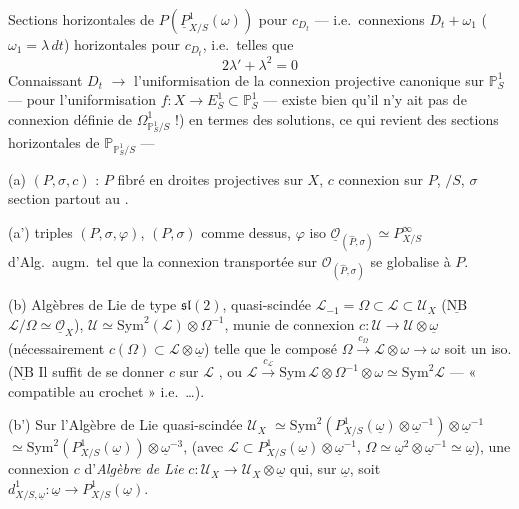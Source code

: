 \documentclass[11pt,a4paper]{article}
\begin{document}
Sections horizontales de $P(\underline{P}^1_{X/S}(\omega))$ pour $c_{D_t}$ — i.e.\ connexions $D_t+\omega_1$ ($\omega_1=\lambda\,dt$) horizontales pour $c_{D_t}$, i.e.\ telles que
\[
2\lambda'+\lambda^2=0
\]
Connaissant $D_t$ $\to$ l'uniformisation de la connexion projective canonique sur $\mathbb{P}^1_S$ — \ill{} pour l'uniformisation \emph{} $f:X\to E^1_S\subset\mathbb{P}^1_S$ — \ill{} existe bien qu'il n'y ait pas de connexion  définie de $\Omega^1_{\mathbb{P}^1_S/S}$ !) en termes des solutions, ce qui revient  des sections horizontales de $\mathbb{P}_{\mathbb{P}^1_S/S}$ —


(a) $(P,\sigma,c)$ : $P$ fibré en droites projectives sur $X$, $c$ connexion sur $P$,  $/S$, $\sigma$ section partout  au  \ill{}.

(a') triples $(P,\sigma,\varphi)$, $(P,\sigma)$ comme dessus, $\varphi$ iso \struck{\ill{}} $\underline{\mathcal{O}}_{(\widehat{P},\sigma)}\simeq P^\infty_{X/S}$ d'Alg.\ augm.\ tel que la connexion transportée sur $\mathcal{O}_{(\widehat{P},\sigma)}$  se globalise à $P$.

(b) Algèbres de Lie de type $\mathfrak{sl}(2)$, quasi-scindée $\mathcal{L}_{-1}=\Omega\subset\mathcal{L}\subset\mathcal{U}_X$ ($\underline{\text{NB}}$ $\mathcal{L}/\Omega\simeq\underline{\mathcal{O}}_X$), $\mathcal{U}\simeq\mathrm{Sym}^2(\mathcal{L})\otimes\Omega^{-1}$, munie de connexion $c:\mathcal{U}\to\mathcal{U}\otimes\underline{\omega}$ (nécessairement $c(\Omega)\subset\mathcal{L}\otimes\underline{\omega}$) telle que le composé $\Omega\xrightarrow{c_\Omega}\mathcal{L}\otimes\omega\to\omega$ soit un iso. ($\underline{\text{NB}}$ Il suffit de se donner $c$ sur $\mathcal{L}$ \struck{\ill{}}, ou $\mathcal{L}\xrightarrow{c_{\mathcal{L}}}\mathrm{Sym}\,\mathcal{L}\otimes\Omega^{-1}\otimes\omega\simeq\mathrm{Sym}^2\mathcal{L}$ — « compatible au crochet » i.e.\ …).

(b') Sur l'Algèbre de Lie quasi-scindée $\mathcal{U}_X$ $\simeq\mathrm{Sym}^2(P^1_{X/S}(\underline{\omega})\otimes\underline{\omega}^{-1})\otimes\underline{\omega}^{-1}$ $\simeq\mathrm{Sym}^2(P^1_{X/S}(\underline{\omega}))\otimes\underline{\omega}^{-3}$,  (avec $\mathcal{L}\subset P^1_{X/S}(\underline{\omega})\otimes\underline{\omega}^{-1}$, $\Omega\simeq\underline{\omega}^2\otimes\underline{\omega}^{-1}\simeq\underline{\omega}$), une connexion $c$ d'\emph{Algèbre de Lie} \struck{\ill{}} $c:\mathcal{U}_X\to\mathcal{U}_X\otimes\underline{\omega}$ qui, sur $\underline{\omega}$, soit $d^1_{X/S,\underline{\omega}}:\underline{\omega}\to P^1_{X/S}(\underline{\omega})$.
\end{document}
